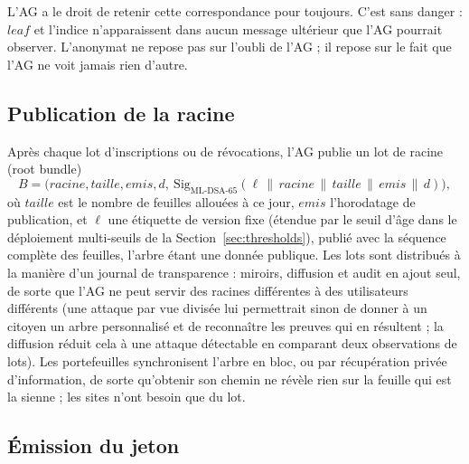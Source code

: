 \documentclass[11pt]{article}
\theoremstyle{definition}
\begin{document}
L'AG a le droit de retenir cette correspondance pour toujours. C'est sans danger :
$\mathit{leaf}$ et l'indice n'apparaissent dans aucun message ultérieur que l'AG pourrait
observer. L'anonymat ne repose pas sur l'oubli de l'AG ; il repose sur le fait que l'AG ne
voit jamais rien d'autre.

\subsection{Publication de la racine}
\label{sec:rootpub}

Après chaque lot d'inscriptions ou de révocations, l'AG publie un lot de racine (root
bundle)
\[
B = \bigl(\mathit{racine}, \mathit{taille}, \mathit{emis}, d,\
\mathrm{Sig}_{\text{ML-DSA-65}}(\ell \,\|\, \mathit{racine} \,\|\, \mathit{taille} \,\|\,
\mathit{emis} \,\|\, d)\bigr),
\]
où $\mathit{taille}$ est le nombre de feuilles allouées à ce jour, $\mathit{emis}$
l'horodatage de publication, et $\ell$ une étiquette de version fixe (étendue par le seuil d'âge dans le
déploiement multi-seuils de la Section~\ref{sec:thresholds}), publié avec la séquence
complète des feuilles, l'arbre étant une donnée publique. Les
lots sont distribués à la manière d'un journal de transparence : miroirs, diffusion et
audit en ajout seul, de sorte que l'AG ne peut servir des racines différentes à des
utilisateurs différents (une attaque par vue divisée lui permettrait sinon de donner à un
citoyen un arbre personnalisé et de reconnaître les preuves qui en résultent ; la
diffusion réduit cela à une attaque détectable en comparant deux observations de lots).
Les portefeuilles synchronisent l'arbre en bloc, ou par récupération privée d'information,
de sorte qu'obtenir son chemin ne révèle rien sur la feuille qui est la sienne ; les sites
n'ont besoin que du lot.

\subsection{Émission du jeton}
\label{sec:issuance}
\end{document}
